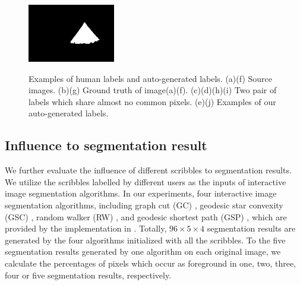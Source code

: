 \documentclass[runningheads,a4paper]{llncs}
\begin{document}
\begin{figure}[!tb]
{\includegraphics[width=0.15\columnwidth,height=1in]{images/188063-gt.png}
}

\caption{Examples of human labels and auto-generated labels. (a)(f) Source images. (b)(g) Ground truth of image(a)(f). (c)(d)(h)(i) Two pair of labels which share almost no common pixels. (e)(j) Examples of our auto-generated labels.}
\label{fig:example}
\end{figure}


\subsection{Influence to segmentation result}

We further evaluate the influence of different scribbles to segmentation results. We utilize the scribbles labelled by different users as the inputs of interactive image segmentation algorithms. In our experiments, four interactive image segmentation algorithms, including graph cut (GC) \cite{boykov2001interactive}, geodesic star convexity (GSC) \cite{gulshan2010geodesic}, random walker (RW) \cite{grady2006random}, and geodesic shortest path (GSP) \cite{bai2007geodesic}, which are provided by the implementation in \cite{gulshan2010geodesic}. Totally, $96\times 5\times 4$ segmentation results are generated by the four algorithms initialized with all the scribbles. To the five segmentation results generated by one algorithm on each original image, we calculate the percentages of pixels which occur as foreground in one, two, three, four or five segmentation results, respectively.
\end{document}
